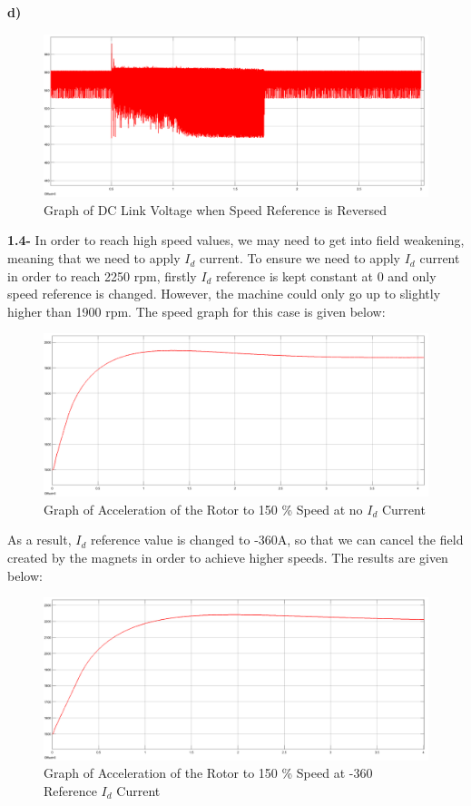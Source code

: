 \documentclass{article}
\begin{document}
\textbf{d)}
\begin{figure}[H]
    \centering
    \includegraphics[scale=0.2]{q3_dc.png}
    \caption{Graph of DC Link Voltage when Speed Reference is Reversed}
    \label{fig:my_label}
\end{figure}
\textbf{1.4-} In order to reach high speed values, we may need to get into field weakening, meaning that we need to apply $I_d$ current. To ensure we need to apply $I_d$ current in order to reach 2250 rpm, firstly $I_d$ reference is kept constant at 0 and only speed reference is changed. However, the machine could only go up to slightly higher than 1900 rpm. The speed graph for this case is given below:
\begin{figure}[H]
    \centering
    \includegraphics[scale=0.2]{no_dq.png}
    \caption{Graph of Acceleration of the Rotor to 150 \% Speed at no $I_d$ Current}
    \label{fig:my_label}
\end{figure}
As a result, $I_d$ reference value is changed to -360A, so that we can cancel the field created by the magnets in order to achieve higher speeds. The results are given below:
\begin{figure}[H]
    \centering
    \includegraphics[scale=0.2]{with_dq.png}
    \caption{Graph of Acceleration of the Rotor to 150 \% Speed at -360 Reference $I_d$ Current}
    \label{fig:my_label}
\end{figure}
\end{document}
